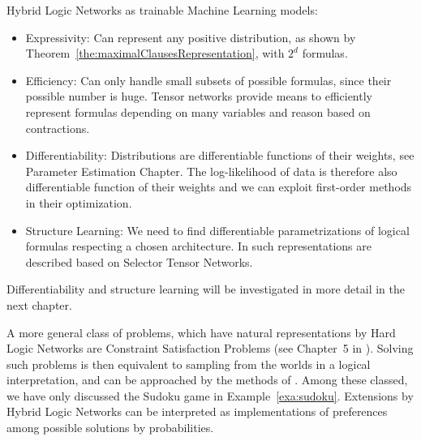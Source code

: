 Hybrid Logic Networks as trainable Machine Learning models:
\begin{itemize}
	\item Expressivity: Can represent any positive distribution, as shown by Theorem~\ref{the:maximalClausesRepresentation}, with $2^d$ formulas.
	\item Efficiency: Can only handle small subsets of possible formulas, since their possible number is huge.
		Tensor networks provide means to efficiently represent formulas depending on many variables and reason based on contractions.
	\item Differentiability: Distributions are differentiable functions of their weights, see Parameter Estimation Chapter. 
		The log-likelihood of data is therefore also differentiable function of their weights and we can exploit first-order methods in their optimization.
	\item Structure Learning: We need to find differentiable parametrizations of logical formulas respecting a chosen architecture.
		In  such representations are described based on Selector Tensor Networks.
\end{itemize}
Differentiability and structure learning will be investigated in more detail in the next chapter.





A more general class of problems, which have natural representations by Hard Logic Networks are Constraint Satisfaction Problems (see Chapter~5 in \cite{russell_artificial_2021}).
Solving such problems is then equivalent to sampling from the worlds in a logical interpretation, and can be approached by the methods of .
Among these classed, we have only discussed the Sudoku game in Example~\ref{exa:sudoku}.
Extensions by Hybrid Logic Networks can be interpreted as implementations of preferences among possible solutions by probabilities.




